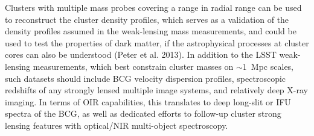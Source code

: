 Clusters with multiple mass probes covering a range in radial range can be used to reconstruct the cluster density profiles, which serves as a validation of the density profiles assumed in the weak-lensing mass measurements, and could be used to test the properties of dark matter, if the astrophysical processes at cluster cores can also be understood (Peter et al. 2013).  In addition to the LSST weak-lensing measurements, which best constrain cluster masses on $\sim1$~Mpc scales, such datasets should include BCG velocity dispersion profiles, spectroscopic redshifts of any strongly lensed multiple image systems, and relatively deep X-ray imaging. In terms of OIR capabilities, this translates to deep long-slit or IFU spectra of the BCG, as well as dedicated efforts to follow-up cluster strong lensing features with optical/NIR multi-object spectroscopy.  %



